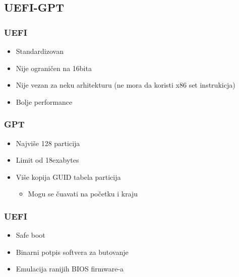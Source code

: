 \documentclass{beamer}
\begin{document}
\subsection*{UEFI-GPT}
\begin{frame}
    \frametitle{UEFI}
    \begin{itemize}
        \item Standardizovan \newline
        \item Nije ograničen na 16bita \newline
        \item Nije vezan za neku arhitekturu (ne mora da koristi x86 set instrukicja)\newline
        \item Bolje performance 
    \end{itemize}
\end{frame}

\begin{frame}
    \frametitle{GPT}
    \begin{itemize}
        \item Najviše 128 particija \newline
        \item Limit od 18exabytes \newline
        \item Više kopija GUID tabela particija \begin{itemize}
            \item Mogu se čuavati na početku i kraju
        \end{itemize}
    \end{itemize}
\end{frame}

\begin{frame}
    \frametitle{UEFI}
    \begin{itemize}
        \item Safe boot \newline
        \item Binarni potpis softvera za butovanje \newline
        \item Emulacija ranijih BIOS firmware-a
    \end{itemize}
\end{frame}

\subsection*{}
\end{document}
